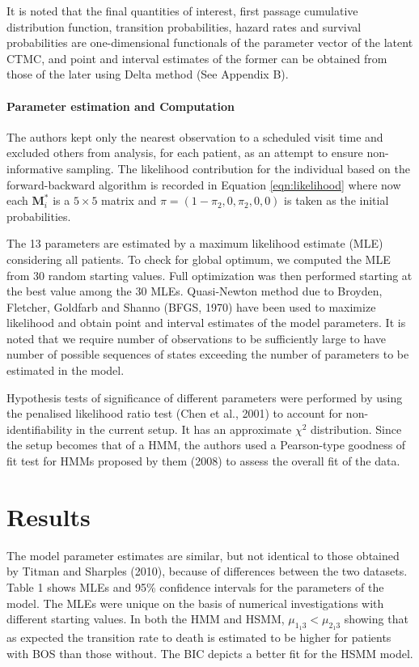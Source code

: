 \documentclass{uwstat572}
\begin{document}
It is noted that the final quantities of interest, first passage cumulative distribution function, transition probabilities, hazard rates and survival probabilities are one-dimensional functionals of the parameter vector of the latent CTMC, and point and interval estimates of the former can be obtained from those of the later using Delta method (See Appendix B).

\paragraph{Parameter estimation and Computation}
The authors kept only the nearest observation to a scheduled visit time and excluded others from analysis, for each patient, as an attempt to ensure non-informative sampling. The likelihood contribution for the individual based on the forward-backward algorithm is recorded in Equation \ref{eqn:likelihood} where now each $\bm{M}_i^*$ is a $5\times 5$ matrix and $\pi=(1-\pi_{2},0,\pi_{2},0,0)$ is taken as the initial probabilities.

The 13 parameters are estimated by a maximum likelihood estimate (MLE) considering all patients. To check for global optimum, we computed the MLE from 30 random starting values. Full optimization was then performed starting at the best value among the 30 MLEs. Quasi-Newton method due to Broyden, Fletcher, Goldfarb and Shanno (BFGS, 1970) have been used to maximize likelihood and obtain point and interval estimates of the model parameters. It is noted that we require number of observations to be sufficiently large to have number of possible sequences of states exceeding the number of parameters to be estimated in the model.

Hypothesis tests of significance of different parameters were performed  by using the penalised likelihood ratio test (Chen et al., 2001) to account for non-identifiability in the current setup. It has an approximate $\chi^2$ distribution. Since the setup becomes that of a HMM, the authors used a Pearson-type goodness of fit test for HMMs proposed by them (2008) to assess the overall fit of the data.
\section{Results}
The model parameter estimates are similar, but not identical to those obtained by Titman and Sharples (2010), because of differences between the two datasets. Table 1 shows MLEs and 95\% confidence intervals for the parameters of the model. The MLEs were unique on the basis of numerical investigations with different starting values. In both the HMM and HSMM, $\mu_{1_1 3}<\mu_{2_1 3}$ showing that as expected the transition rate to death is estimated to be higher for patients with BOS than those without. The BIC depicts a better fit for the HSMM model.
\end{document}
